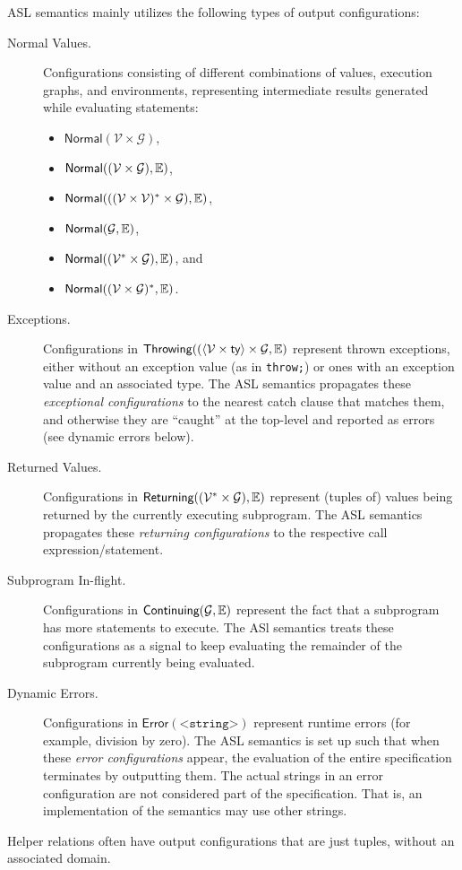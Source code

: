 \documentclass{book}
\newcommand\XGraphs[0]{\mathcal{G}}
\newcommand\vals[0]{\mathcal{V}}
\newcommand\Normal[0]{\textsf{Normal}}
\newcommand\Throwing[0]{\textsf{Throwing}}
\newcommand\Continuing[0]{\textsf{Continuing}}
\newcommand\Returning[0]{\textsf{Returning}}
\newcommand\Error[0]{\textsf{Error}}
\begin{document}
ASL semantics mainly utilizes the following types of output configurations:
\begin{description}
  \item[Normal Values.] Configurations consisting of different combinations of values,
  execution graphs, and environments, representing intermediate results
  generated while evaluating statements:
  \begin{itemize}
  \item $\Normal(\vals \times \XGraphs)$,
  \item $\Normal((\vals \times \XGraphs), \envs)$,
  \item $\Normal(((\vals \times \vals)^* \times \XGraphs), \envs)$,
  \item $\Normal(\XGraphs, \envs)$,
  \item $\Normal((\vals^* \times \XGraphs), \envs)$, and
  \item $\Normal((\vals\times\XGraphs)^*, \envs)$.
  \end{itemize}

  \item[Exceptions.] Configurations in $\Throwing((\langle\vals \times \ty\rangle \times \XGraphs, \envs)$
  represent thrown exceptions,
  either without an exception value (as in \texttt{throw;}) or ones with an exception value and an associated type.
  The ASL semantics propagates these \emph{exceptional configurations} to the nearest catch clause that matches
  them, and otherwise they are ``caught'' at the top-level and reported as errors (see dynamic errors below).

  \item[Returned Values.] Configurations in $\Returning((\vals^* \times \XGraphs), \envs)$
  represent (tuples of) values being returned by the currently executing subprogram.
  The ASL semantics propagates these \emph{returning configurations} to the respective call expression/statement.

  \item[Subprogram In-flight.] Configurations in $\Continuing(\XGraphs, \envs)$
  represent the fact that a subprogram has more statements to execute.
  The ASl semantics treats these configurations as a signal to keep evaluating the remainder
  of the subprogram currently being evaluated.

  \item[Dynamic Errors.] Configurations in $\Error(\texttt{<string>})$
  represent runtime errors (for example, division by zero).
  The ASL semantics is set up such that when these \emph{error configurations} appear,
  the evaluation of the entire specification terminates by outputting them.
  The actual strings in an error configuration are not considered part of the specification.
  That is, an implementation of the semantics may use other strings.
\end{description}
Helper relations often have output configurations that are just tuples, without an associated domain.
\end{document}

